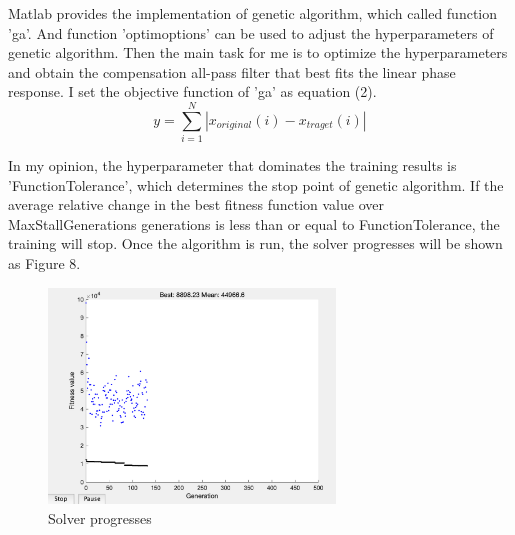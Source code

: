 \documentclass[a4paper]{tufte-handout} %
\begin{document}
Matlab provides the implementation of genetic algorithm, which called function 'ga'. And function 'optimoptions' can be used to adjust the hyperparameters of genetic algorithm. Then the main task for me is to optimize the hyperparameters and obtain the compensation all-pass filter that best fits the linear phase response. I set the objective function of 'ga' as equation (2).
\begin{equation}
y=\sum_{i=1}^N{|x_{original}(i)-x_{traget}(i)|}
\end{equation}

In my opinion, the hyperparameter that dominates the training results is 'FunctionTolerance', which determines the stop point of genetic algorithm. If the average relative change in the best fitness function value over MaxStallGenerations generations is less than or equal to FunctionTolerance, the training will stop. Once the algorithm is run, the solver progresses will be shown as Figure 8.
\begin{figure}[h]
    \centering
	\includegraphics[width=3in]{Image/Generation.png}
	\caption{Solver progresses}
	\label{fig:textfig}
\end{figure}
\end{document}
